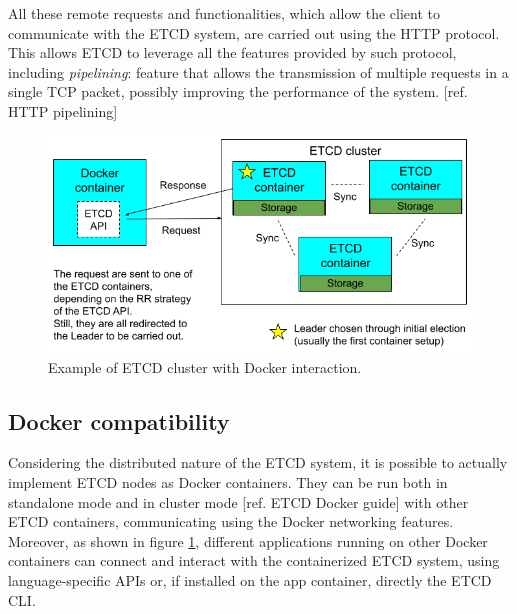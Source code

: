 All these remote requests and functionalities, which allow the client to communicate with the ETCD system, are carried out using the HTTP protocol. This allows ETCD to leverage all the features provided by such protocol, including \textit{pipelining}: feature that allows the transmission of multiple requests in a single TCP packet, possibly improving the performance of the system. [ref. HTTP pipelining]
\begin{figure}[h!]
	\centering
	\includegraphics[width=0.85\linewidth]{"immagini/Technologies/ETCD cluster"}
	\caption[Example of ETCD cluster with Docker interaction.]{Example of ETCD cluster with Docker interaction.}
	\label{fig:etcd-cluster}
\end{figure}

\subsection{Docker compatibility}
Considering the distributed nature of the ETCD system, it is possible to actually implement ETCD nodes as Docker containers. They can be run both in standalone mode and in cluster mode [ref. ETCD Docker guide] with other ETCD containers, communicating using the Docker networking features. \\
Moreover, as shown in figure \ref{fig:etcd-cluster}, different applications running on other Docker containers can connect and interact with the containerized ETCD system, using language-specific APIs or, if installed on the app container, directly the ETCD CLI.

